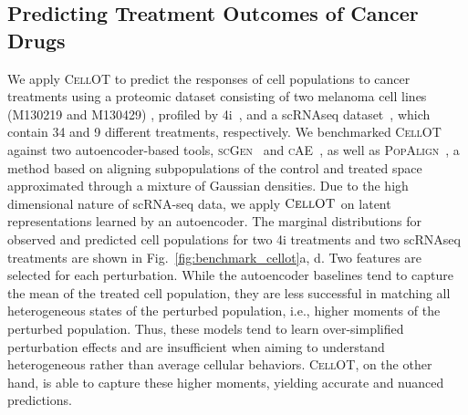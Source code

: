 \subsection{Predicting Treatment Outcomes of Cancer Drugs}

 We apply \textsc{CellOT} to predict the responses of cell populations to cancer treatments using a proteomic dataset consisting of two melanoma cell lines (M130219 and M130429) \citep{raaijmakers2015new}, profiled by 4i~\citep{gut2018multiplexed}, and a scRNAseq dataset~\citep{srivatsan2020massively}, which contain 34 and 9 different treatments, respectively.
We benchmarked \textsc{CellOT} against two autoencoder-based tools, \textsc{scGen}~\citep{lotfollahi2019scgen} and \textsc{cAE}~\citep{lopez2018scvi}, as well as \textsc{PopAlign}~\citep{chen2020dissecting}, a method based on aligning subpopulations of the control and treated space approximated through a mixture of Gaussian densities.
Due to the high dimensional nature of scRNA-seq data, we apply $\textsc{CellOT}$ on latent representations learned by an autoencoder.
The marginal distributions for observed and predicted cell populations for two 4i treatments and two scRNAseq treatments are shown in Fig.~\ref{fig:benchmark_cellot}a, d. 
Two features are selected for each perturbation.
While the autoencoder baselines tend to capture the mean of the treated cell population, they are less successful in matching all heterogeneous states of the perturbed population, i.e., higher moments of the perturbed population.
Thus, these models tend to learn over-simplified perturbation effects and are insufficient when aiming to understand heterogeneous rather than average cellular behaviors.
\textsc{CellOT}, on the other hand, is able to capture these higher moments, yielding accurate and nuanced predictions.

